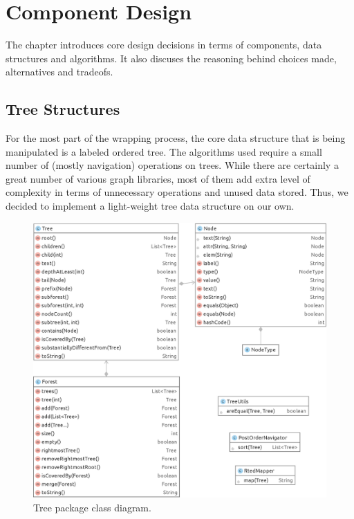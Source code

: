 \chapter{Component Design}


The chapter introduces core design decisions in terms of components, data structures and algorithms. It also discuses the reasoning behind choices made, alternatives and tradeofs.


\section{Tree Structures}

For the most part of the wrapping process, the core data structure that is being manipulated is a labeled ordered tree. The algorithms used require a small number of (mostly navigation) operations on trees. While there are certainly a great number of various graph libraries, most of them add extra level of complexity in terms of unnecessary operations and unused data stored. Thus, we decided to implement a light-weight tree data structure on our own.

\begin{figure}[h]
	\centering
	\includegraphics[width=1.0\textwidth]{figures/package-tree}
	\caption{Tree package class diagram.}
	\label{fig:package-tree}
\end{figure}

